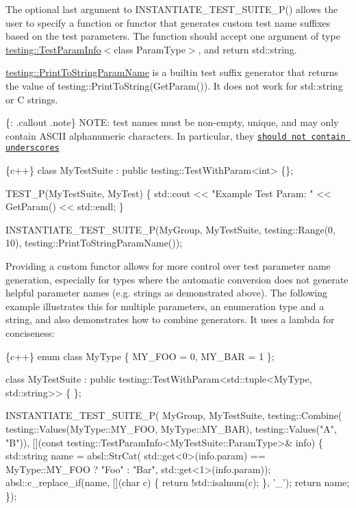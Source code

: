 The optional last argument to {\ttfamily I\+N\+S\+T\+A\+N\+T\+I\+A\+T\+E\+\_\+\+T\+E\+S\+T\+\_\+\+S\+U\+I\+T\+E\+\_\+\+P()} allows the user to specify a function or functor that generates custom test name suffixes based on the test parameters. The function should accept one argument of type {\ttfamily \mbox{\hyperlink{structtesting_1_1TestParamInfo}{testing\+::\+Test\+Param\+Info}}$<$class Param\+Type$>$}, and return {\ttfamily std\+::string}.

{\ttfamily \mbox{\hyperlink{structtesting_1_1PrintToStringParamName}{testing\+::\+Print\+To\+String\+Param\+Name}}} is a builtin test suffix generator that returns the value of {\ttfamily testing\+::\+Print\+To\+String(\+Get\+Param())}. It does not work for {\ttfamily std\+::string} or C strings.

\{\+: .callout .note\} N\+O\+TE\+: test names must be non-\/empty, unique, and may only contain A\+S\+C\+II alphanumeric characters. In particular, they \href{faq.md#why-should-test-suite-names-and-test-names-not-contain-underscore}{\tt should not contain underscores}


\begin{DoxyCode}
\{c++\}
class MyTestSuite : public testing::TestWithParam<int> \{\};

TEST\_P(MyTestSuite, MyTest)
\{
  std::cout << "Example Test Param: " << GetParam() << std::endl;
\}

INSTANTIATE\_TEST\_SUITE\_P(MyGroup, MyTestSuite, testing::Range(0, 10),
                         testing::PrintToStringParamName());
\end{DoxyCode}


Providing a custom functor allows for more control over test parameter name generation, especially for types where the automatic conversion does not generate helpful parameter names (e.\+g. strings as demonstrated above). The following example illustrates this for multiple parameters, an enumeration type and a string, and also demonstrates how to combine generators. It uses a lambda for conciseness\+:


\begin{DoxyCode}
\{c++\}
enum class MyType \{ MY\_FOO = 0, MY\_BAR = 1 \};

class MyTestSuite : public testing::TestWithParam<std::tuple<MyType, std::string>> \{
\};

INSTANTIATE\_TEST\_SUITE\_P(
    MyGroup, MyTestSuite,
    testing::Combine(
        testing::Values(MyType::MY\_FOO, MyType::MY\_BAR),
        testing::Values("A", "B")),
    [](const testing::TestParamInfo<MyTestSuite::ParamType>& info) \{
      std::string name = absl::StrCat(
          std::get<0>(info.param) == MyType::MY\_FOO ? "Foo" : "Bar",
          std::get<1>(info.param));
      absl::c\_replace\_if(name, [](char c) \{ return !std::isalnum(c); \}, '\_');
      return name;
    \});
\end{DoxyCode}


